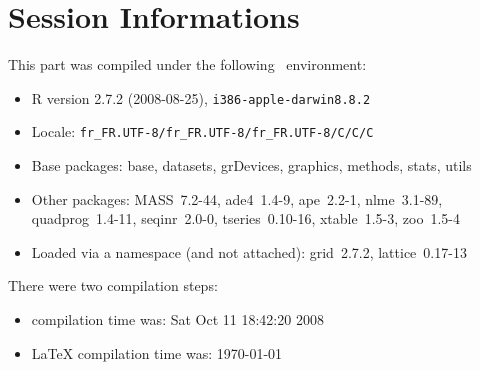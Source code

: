 \documentclass{article}
\begin{document}
\section*{Session Informations}

This part was compiled under the following \Rlogo{}~environment:

\begin{itemize}
  \item R version 2.7.2 (2008-08-25), \verb|i386-apple-darwin8.8.2|
  \item Locale: \verb|fr_FR.UTF-8/fr_FR.UTF-8/fr_FR.UTF-8/C/C/C|
  \item Base packages: base, datasets, grDevices, graphics, methods,
    stats, utils
  \item Other packages: MASS~7.2-44, ade4~1.4-9, ape~2.2-1,
    nlme~3.1-89, quadprog~1.4-11, seqinr~2.0-0, tseries~0.10-16,
    xtable~1.5-3, zoo~1.5-4
  \item Loaded via a namespace (and not attached): grid~2.7.2,
    lattice~0.17-13
\end{itemize}
There were two compilation steps:

\begin{itemize}
  \item \Rlogo{} compilation time was: Sat Oct 11 18:42:20 2008
  \item \LaTeX{} compilation time was: \today
\end{itemize}


\clearpage
{}


\end{document}
